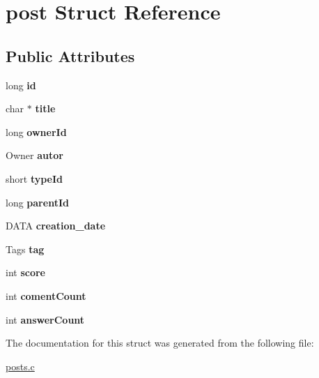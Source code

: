 \hypertarget{structpost}{}\section{post Struct Reference}
\label{structpost}
\subsection*{Public Attributes}
\begin{DoxyCompactItemize}
\item 
long {\bfseries id}\hypertarget{structpost_afcd847f54ea0504d5b4abe26a26193d8}{}\label{structpost_afcd847f54ea0504d5b4abe26a26193d8}

\item 
char $\ast$ {\bfseries title}\hypertarget{structpost_a4661e2a92f6d17f661b969e268886675}{}\label{structpost_a4661e2a92f6d17f661b969e268886675}

\item 
long {\bfseries owner\+Id}\hypertarget{structpost_a155138ea6b8ee3c6b82c6357d298c6ed}{}\label{structpost_a155138ea6b8ee3c6b82c6357d298c6ed}

\item 
Owner {\bfseries autor}\hypertarget{structpost_a6b72b4dd0870b6d27cd9325dc2aa6deb}{}\label{structpost_a6b72b4dd0870b6d27cd9325dc2aa6deb}

\item 
short {\bfseries type\+Id}\hypertarget{structpost_ae3e9700935a937a05f84f80c6bfc71b3}{}\label{structpost_ae3e9700935a937a05f84f80c6bfc71b3}

\item 
long {\bfseries parent\+Id}\hypertarget{structpost_a8046c205699411d217eee05424ea2807}{}\label{structpost_a8046c205699411d217eee05424ea2807}

\item 
D\+A\+TA {\bfseries creation\+\_\+date}\hypertarget{structpost_a389654f3729afa4bb91ab373efa2f441}{}\label{structpost_a389654f3729afa4bb91ab373efa2f441}

\item 
Tags {\bfseries tag}\hypertarget{structpost_a711058c69dd3af6db1db1ec40b78328f}{}\label{structpost_a711058c69dd3af6db1db1ec40b78328f}

\item 
int {\bfseries score}\hypertarget{structpost_a044eb6045f2d098c8573e472b74d3de4}{}\label{structpost_a044eb6045f2d098c8573e472b74d3de4}

\item 
int {\bfseries coment\+Count}\hypertarget{structpost_a1d5baf23159046d2aa197a274d210de4}{}\label{structpost_a1d5baf23159046d2aa197a274d210de4}

\item 
int {\bfseries answer\+Count}\hypertarget{structpost_a1c00818eb0fc23d69ef9f4a76b4f6c49}{}\label{structpost_a1c00818eb0fc23d69ef9f4a76b4f6c49}

\end{DoxyCompactItemize}


The documentation for this struct was generated from the following file\+:\begin{DoxyCompactItemize}
\item 
\hyperlink{posts_8c}{posts.\+c}\end{DoxyCompactItemize}
